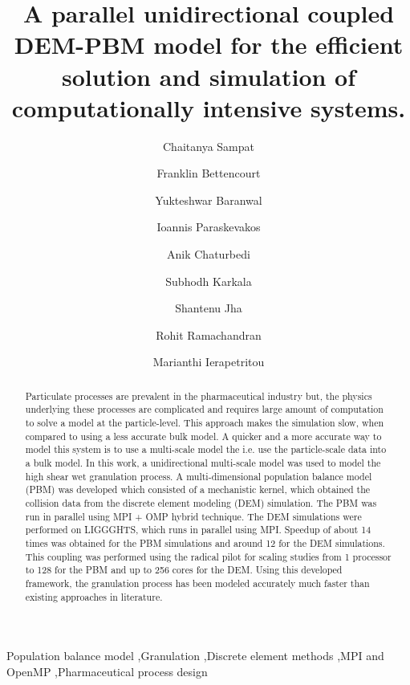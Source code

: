 \documentclass[preprint,11pt,authoryear]{elsarticle}
\begin{document}
\begin{frontmatter}

\title{A parallel unidirectional coupled DEM-PBM model for the efficient solution and simulation of 
computationally  intensive systems.}
\author[add1]{Chaitanya Sampat}
\author[add1]{Franklin Bettencourt}
\author[add1]{Yukteshwar Baranwal}
\author[add2]{Ioannis Paraskevakos}
\author[add1]{Anik Chaturbedi}
\author[add1]{Subhodh Karkala}
\author[add2]{Shantenu Jha}
\author[add1]{Rohit Ramachandran}
\author[add1]{Marianthi Ierapetritou}
\address[add1]{Department of Chemical and Biochemical Engineering, Rutgers, The State University of New
Jersey, Piscataway, NJ, USA-08854}
\address[add2]{Electrical and Computer Engineering, Rutgers, The State University of New Jersey, 
Piscataway, NJ, USA-08854}

\begin{abstract}
Particulate processes are prevalent in the pharmaceutical industry but, the physics underlying 
these processes are complicated and requires large amount of computation to solve a model at the
particle-level. This approach makes the simulation slow, when compared to using a less accurate 
bulk model. A quicker and a more accurate way to model this system is to use a multi-scale 
model the i.e. use the particle-scale data into a bulk model. 
In this work, a unidirectional multi-scale model was used to model the high shear wet granulation 
process. A multi-dimensional population balance model (PBM) was developed which 
consisted of a mechanistic kernel, which obtained the collision data from the discrete element 
modeling (DEM) simulation. The PBM was run in parallel using MPI + OMP hybrid technique. The DEM 
simulations were performed on
LIGGGHTS, which runs in parallel using MPI. Speedup of about 14 times was obtained for the PBM 
simulations and around 12 for the DEM simulations. This coupling was performed using the radical 
pilot for scaling studies from 1 processor to 128 for the PBM and up to 256 cores for the DEM. Using 
this developed framework, the granulation process has been modeled accurately 
much faster than existing approaches in literature.
\end{abstract}
\begin{keyword}
Population balance model \sep Granulation \sep Discrete element methods  \sep MPI and OpenMP 
\sep Pharmaceutical process design
\end{keyword}
\end{frontmatter}
\linenumbers
\end{document}
